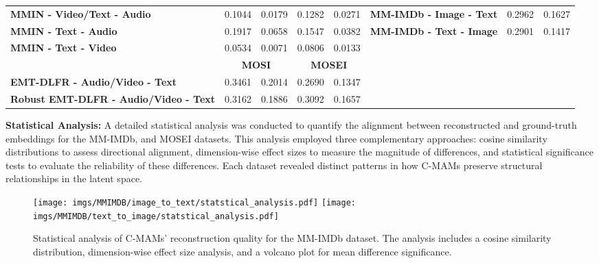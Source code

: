 \begin{table}[t!]
{\begin{tabular}{l|cc|cc|l|cc}
    \textbf{MMIN - Video/Text - Audio}            & 0.1044            & 0.0179            & 0.1282              & 0.0271             & \textbf{MM-IMDb - Image - Text}          & 0.2962                        & 0.1627                        \\
    \textbf{MMIN - Text - Audio}                  & 0.1917            & 0.0658            & 0.1547              & 0.0382             & \textbf{MM-IMDb - Text - Image}          & 0.2901                        & 0.1417                        \\
    \textbf{MMIN - Text - Video}                  & 0.0534            & 0.0071            & 0.0806              & 0.0133             &                                          &                               &                               \\ \cline{1-5}
    \textbf{}                                     & \multicolumn{2}{c|}{\textbf{MOSI}}    & \multicolumn{2}{c|}{\textbf{MOSEI}}      &                                          &                               &                               \\ \cline{1-5}
    \textbf{EMT-DLFR - Audio/Video - Text}        & 0.3461            & 0.2014            & 0.2690              & 0.1347             &                                          &                               &                               \\
    \textbf{Robust EMT-DLFR - Audio/Video - Text} & 0.3162            & 0.1886            & 0.3092              & 0.1657             &                                          & \multicolumn{1}{l}{}          & \multicolumn{1}{l}{}          \\ \hline
    \end{tabular}%
    }
\end{table}

\textbf{Statistical Analysis:} A detailed statistical analysis was conducted to quantify the alignment between reconstructed and ground-truth embeddings for the MM-IMDb, and MOSEI datasets. This analysis employed three complementary approaches: cosine similarity distributions to assess directional alignment, dimension-wise effect sizes to measure the magnitude of differences, and statistical significance tests to evaluate the reliability of these differences. Each dataset revealed distinct patterns in how C-MAMs preserve structural relationships in the latent space.

\begin{figure}[b!]
    \centering
    \texttt{[image: imgs/MMIMDB/image\_to\_text/statstical\_analysis.pdf]}
    \texttt{[image: imgs/MMIMDB/text\_to\_image/statstical\_analysis.pdf]}
    \caption{Statistical analysis of C-MAMs' reconstruction quality for the MM-IMDb dataset. The analysis includes a cosine similarity distribution, dimension-wise effect size analysis, and a volcano plot for mean difference significance.}
    \label{fig:mmimdb_stats}
\end{figure}

